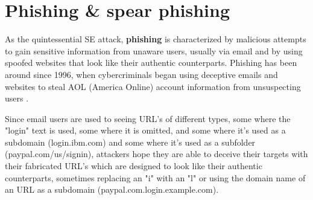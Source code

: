 









\section{Phishing \& spear phishing}
\begin{comment}
    
    - 

\end{comment}


As the quintessential SE attack, \textbf{phishing} is characterized by malicious attempts to gain sensitive information from unaware users, usually via email and by using spoofed websites that look like their authentic counterparts. Phishing has been around since 1996, when cybercriminals began using deceptive emails and websites to steal AOL (America Online) account information from unsuspecting users \citep{wangDefiningSocialEngineering2020}.


Since email users are used to seeing URL's of different types, some where the "login" text is used, some where it is omitted, and some where it's used as a subdomain (login.ibm.com) and some where it's used as a subfolder (paypal.com/us/signin), attackers hope they are able to deceive their targets with their fabricated URL's which are designed to look like their authentic counterparts, sometimes replacing an "i" with an "l" or using the domain name of an URL as a subdomain (paypal.com.login.example.com).

